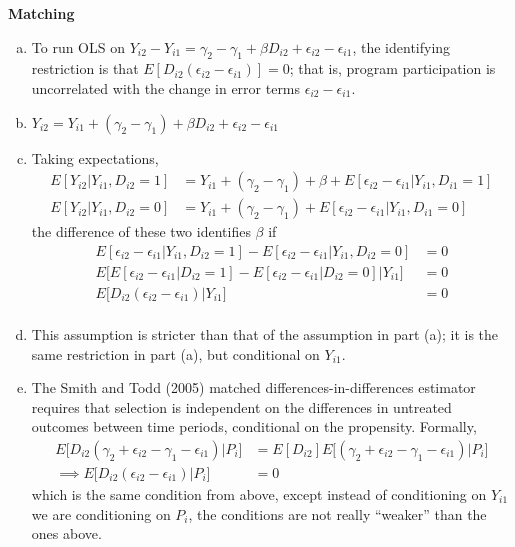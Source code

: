 \documentclass[11pt]{article}
\begin{document}
\bigskip \textbf{Matching}

\begin{enumerate}[(a)]

	\item To run OLS on $Y_{i2} - Y_{i1} = \gamma_2 - \gamma_1 + \beta D_{i2} + \epsilon_{i2} - \epsilon_{i1}$, the identifying restriction is that $E\left[D_{i2} (\epsilon_{i2} - \epsilon_{i1})\right] = 0$; that is, program participation is uncorrelated with the change in error terms $\epsilon_{i2} - \epsilon_{i1}$.

	\item $Y_{i2} = Y_{i1} + (\gamma_2 - \gamma_1) + \beta D_{i2} + \epsilon_{i2} - \epsilon_{i1}$

	\item Taking expectations,
	\begin{align*}
		E\left[Y_{i2} | Y_{i1}, D_{i2} = 1\right] &= Y_{i1} + (\gamma_2 - \gamma_1) + \beta + E[\epsilon_{i2} - \epsilon_{i1} | Y_{i1}, D_{i1}=1]\\
		E\left[Y_{i2} | Y_{i1}, D_{i2} = 0\right] &= Y_{i1} + (\gamma_2 - \gamma_1) + E[\epsilon_{i2} - \epsilon_{i1} | Y_{i1}, D_{i1}=0]
	\end{align*}
	the difference of these two identifies $\beta$ if
	\begin{align*}
		E[\epsilon_{i2} - \epsilon_{i1} | Y_{i1}, D_{i2}=1] - E[\epsilon_{i2} - \epsilon_{i1} | Y_{i1}, D_{i2}=0] &= 0 \\
		E \bigg[ E[\epsilon_{i2} - \epsilon_{i1} | D_{i2}=1] - E[\epsilon_{i2} - \epsilon_{i1} | D_{i2}=0] \bigg| Y_{i1} \bigg]&= 0 \\
		E \bigg[ D_{i2} (\epsilon_{i2} - \epsilon_{i1}) \bigg| Y_{i1} \bigg]&= 0 \\
	\end{align*}
	
	\item This assumption is stricter than that of the assumption in part (a); it is the same restriction in part (a), but conditional on $Y_{i1}$.

	\item The Smith and Todd (2005) matched differences-in-differences estimator requires that selection is independent on the differences in untreated outcomes between time periods, conditional on the propensity. Formally,
	\begin{align*}
		E \bigg[ D_{i2} (\gamma_2 + \epsilon_{i2} - \gamma_1 - \epsilon_{i1} ) \bigg| P_{i} \bigg] &= E[D_{i2}] E \bigg[  (\gamma_2 + \epsilon_{i2} - \gamma_1 - \epsilon_{i1} ) \bigg| P_{i} \bigg] \\
		\implies E \bigg[ D_{i2} (\epsilon_{i2} - \epsilon_{i1} ) \bigg| P_{i} \bigg] &= 0
	\end{align*}
	which is the same condition from above, except instead of conditioning on $Y_{i1}$ we are conditioning on $P_i$, the conditions are not really ``weaker'' than the ones above.

\end{enumerate}
\end{document}

